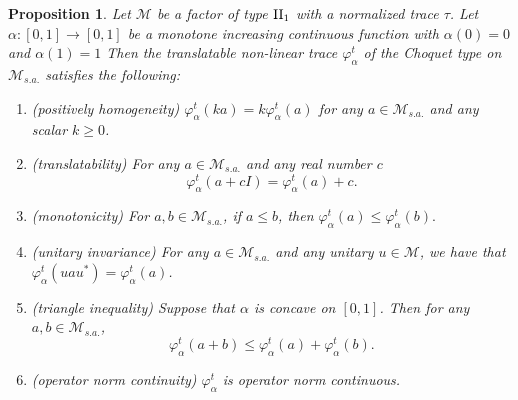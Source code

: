 \documentclass[a4paper,12pt]{amsart}
\newtheorem{proposition}[definition]{Proposition}
\newcommand{\M}{\mathcal{M}}
\begin{document}
\begin{proposition} 
\label{prop:tranlatable}
Let $\M$ be a factor of type ${\rm II}_1$ with a normalized trace $\tau$.  
Let $\alpha: [0,1]  \rightarrow [0, 1]$ be a 
monotone increasing continuous function with $\alpha(0) = 0$ and $\alpha(1) = 1$ 
Then the translatable non-linear trace $\varphi_{\alpha}^{t}$ of the Choquet type on $\M_{s.a.}$ satisfies the following:
\begin{enumerate}
\item[(1)] {\rm (positively homogeneity)} $\varphi_{\alpha}^{t}(ka) = k \varphi_{\alpha}^{t}(a)$ for any 
$a \in  {\M}_{s.a.}$ and any scalar $k \geq 0$. \\
\item[(2)] {\rm (translatability)}  For any $a \in  {\M}_{s.a.}$ and any real number $c$ 
$$
\varphi_{\alpha}^{t}(a + cI) = \varphi_{\alpha}^{t}(a) + c.
$$
\item[(3)] {\rm (monotonicity)} For $a, b \in {\M}_{s.a.}$, if $a \leq b$, then $\varphi_{\alpha}^{t}(a) \leq 
\varphi_{\alpha}^{t}(b). $\\
\item[(4)] {\rm (unitary invariance)} For any $a \in  \M_{s.a.}$ and any unitary $u \in \M$, we have that 
$\varphi_{\alpha}^{t}(uau^*) =  \varphi_{\alpha}^{t}(a)$. \\
\item[(5)] {\rm (triangle inequality)} Suppose that $\alpha$ is concave on $[0,1]$. Then 
for any $a, b \in {\M}_{s.a.}$, 
$$
 \varphi_{\alpha}^{t}(a + b) \leq  \varphi_{\alpha}^{t}(a) + \varphi_{\alpha}^{t}(b).
$$

\item[(6)] {\rm (operator norm continuity)} $\varphi_{\alpha}^{t}$ is operator norm continuous. 
\end{enumerate}
\end{proposition}
\end{document}
